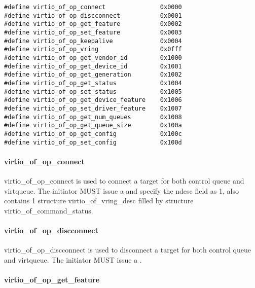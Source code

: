 \begin{lstlisting}
#define virtio_of_op_connect               0x0000
#define virtio_of_op_discconnect           0x0001
#define virtio_of_op_get_feature           0x0002
#define virtio_of_op_set_feature           0x0003
#define virtio_of_op_keepalive             0x0004
#define virtio_of_op_vring                 0x0fff
#define virtio_of_op_get_vendor_id         0x1000
#define virtio_of_op_get_device_id         0x1001
#define virtio_of_op_get_generation        0x1002
#define virtio_of_op_get_status            0x1004
#define virtio_of_op_set_status            0x1005
#define virtio_of_op_get_device_feature    0x1006
#define virtio_of_op_set_driver_feature    0x1007
#define virtio_of_op_get_num_queues        0x1008
#define virtio_of_op_get_queue_size        0x100a
#define virtio_of_op_get_config            0x100c
#define virtio_of_op_set_config            0x100d
\end{lstlisting}

\paragraph{virtio_of_op_connect}\label{sec:Virtio Transport Options / Virtio Over Fabrics / Transmission Protocol / Opcodes Definition / virtio_of_op_connect}

virtio_of_op_connect is used to connect a target for both control queue and virtqueue. The initiator MUST issue a  and specify the ndesc field as 1, also contains 1 structure virtio_of_vring_desc filled by structure virtio_of_command_status.

\paragraph{virtio_of_op_discconnect}\label{sec:Virtio Transport Options / Virtio Over Fabrics / Transmission Protocol / Opcodes Definition / virtio_of_op_discconnect}

virtio_of_op_discconnect is used to disconnect a target for both control queue and virtqueue. The initiator MUST issue a .

\paragraph{virtio_of_op_get_feature}\label{sec:Virtio Transport Options / Virtio Over Fabrics / Transmission Protocol / Opcodes Definition / virtio_of_op_get_feature}

